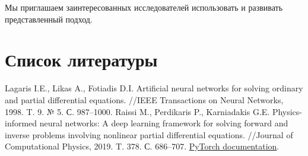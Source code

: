 \documentclass[12pt,a4paper]{article}
\begin{document}
Мы приглашаем заинтересованных исследователей использовать и развивать представленный подход.

\section{Список литературы}
\begin{thebibliography}{99}
 Lagaris I.E., Likas A., Fotiadis D.I. Artificial neural networks for solving ordinary and partial differential equations. //IEEE Transactions on Neural Networks, 1998. T. 9. № 5. С. 987–1000.
 Raissi M., Perdikaris P., Karniadakis G.E. Physics-informed neural networks: A deep learning framework for solving forward and inverse problems involving nonlinear partial differential equations. //Journal of Computational Physics, 2019. T. 378. С. 686–707.
 \href{https://pytorch.org/docs/stable/index.html}{PyTorch documentation}.
\end{thebibliography}
\end{document}
